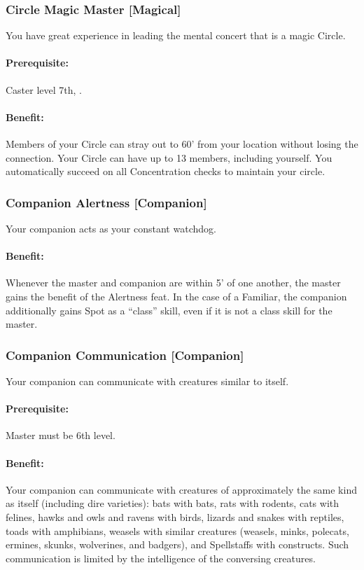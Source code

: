 \subsubsection[Circle Magic Master]{Circle Magic Master [Magical]}
\label{Feat:CircleMagicMaster}
You have great experience in leading the mental concert that is a magic Circle.
\paragraph{Prerequisite:} Caster level 7th, .
\paragraph{Benefit:} Members of your Circle can stray out to 60' from your location without losing the connection. Your Circle can have up to 13 members, including yourself. You automatically succeed on all Concentration checks to maintain your circle.
\subsubsection[Companion Alertness]{Companion Alertness [Companion]}
\label{Feat:CompanionAlertness}
Your companion acts as your constant watchdog.

\paragraph{Benefit:} Whenever the master and companion are within 5' of one another, the master gains the benefit of the Alertness feat.
In the case of a Familiar, the companion additionally gains Spot as a ``class'' skill, even if it is not a class skill for the master.
\subsubsection[Companion Communication]{Companion Communication [Companion]}
\label{Feat:CompanionCommunication}
Your companion can communicate with creatures similar to itself.

\paragraph{Prerequisite:} Master must be 6th level.

\paragraph{Benefit:} Your companion can communicate with creatures of approximately the same kind as itself (including dire varieties): 
bats with bats, rats with rodents, cats with felines, hawks and owls and ravens with birds, 
lizards and snakes with reptiles, toads with amphibians, weasels with similar creatures (weasels, minks, polecats, ermines, skunks, wolverines, and badgers), and Spellstaffs with constructs. 
Such communication is limited by the intelligence of the conversing creatures. 

